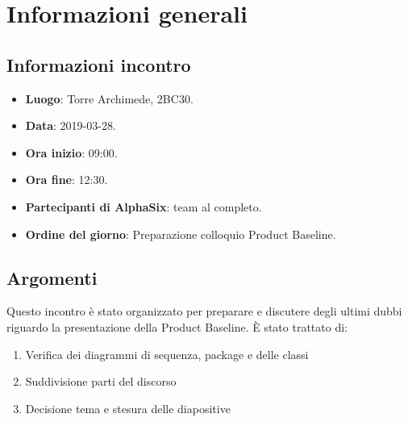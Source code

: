 \newcommand{\documento}{\VI}
\newcommand{\nomedocumentofisico}{VI\_2019-03-28.pdf}
\newcommand{\redazione}{\SG}
\newcommand{\verifica}{\CV}
\newcommand{\approvazione}{\NC}
\newcommand{\versione}{1.0.0}
\newcommand{\uso}{Interno}
\newcommand{\destinateTo}{\gruppo}
\newcommand{\datacreazione}{29 marzo 2019}
\newcommand{\datamodifica}{31 marzo 2019}
\newcommand{\stato}{Approvato}

\def\TABELLE{false}	%
\def\FIGURE{false} 	%






    

    

    \section{Informazioni generali}
		\subsection{Informazioni incontro}
			\begin{itemize}
				\item \textbf{Luogo}: Torre Archimede, 2BC30.
				\item \textbf{Data}: 2019-03-28.
				\item \textbf{Ora inizio}: 09:00.
				\item \textbf{Ora fine}: 12:30.
				\item \textbf{Partecipanti di AlphaSix}: team al completo.
				\item \textbf{Ordine del giorno}: Preparazione colloquio Product Baseline.
			\end{itemize}

        \subsection{Argomenti}
            Questo incontro è stato organizzato per preparare e discutere degli ultimi dubbi riguardo la presentazione della Product Baseline. È stato trattato di:
            \begin{enumerate}
                \item Verifica dei diagrammi di sequenza, package e delle classi
                \item Suddivisione parti del discorso
                \item Decisione tema e stesura delle diapositive
            \end{enumerate}

